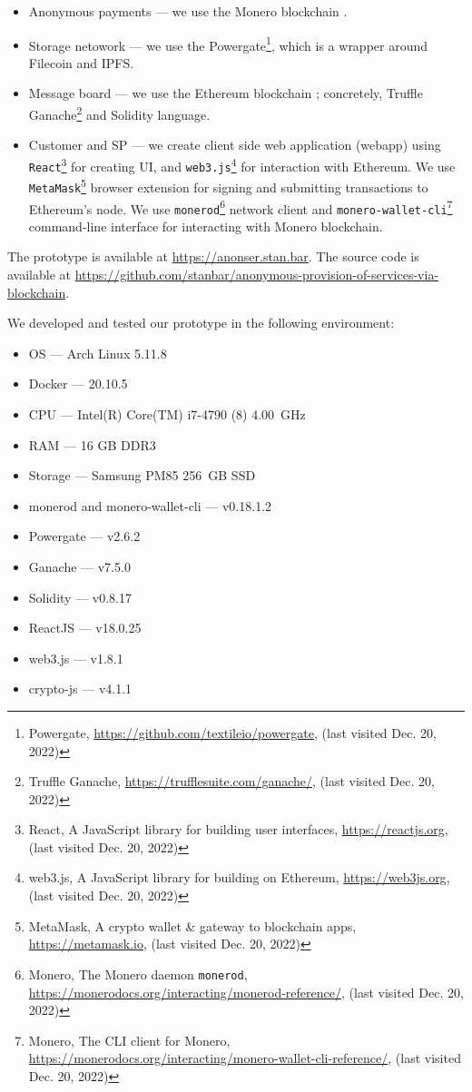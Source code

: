 \begin{itemize}
  \item{Anonymous payments} — we use the Monero blockchain \cite{noetherRingSignatureConfidential2015}.
  \item{Storage netowork} — we use the Powergate\footnote{Powergate, \url{https://github.com/textileio/powergate}, (last visited Dec. 20, 2022)}, which is a wrapper around Filecoin and IPFS.
  \item{Message board} — we use the Ethereum blockchain \cite{woodEthereumSecureDecentralised2014}; concretely, Truffle Ganache\footnote{Truffle Ganache, \url{https://trufflesuite.com/ganache/}, (last visited Dec. 20, 2022)} and Solidity language.
  \item{Customer and SP} — we create client side web application (webapp) using \texttt{React}\footnote{React, A JavaScript library for building user interfaces, \url{https://reactjs.org}, (last visited Dec. 20, 2022)} for creating UI, and \texttt{web3.js}\footnote{web3.js, A JavaScript library for building on Ethereum, \url{https://web3js.org}, (last visited Dec. 20, 2022)} for interaction with Ethereum. We use \texttt{MetaMask}\footnote{MetaMask, A crypto wallet \& gateway to blockchain apps, \url{https://metamask.io}, (last visited Dec. 20, 2022)} browser extension for signing and submitting transactions to Ethereum's node. We use \texttt{monerod}\footnote{Monero, The Monero daemon \texttt{monerod}, \url{https://monerodocs.org/interacting/monerod-reference/}, (last visited Dec. 20, 2022)} network client and \texttt{monero-wallet-cli}\footnote{Monero, The CLI client for Monero, \url{https://monerodocs.org/interacting/monero-wallet-cli-reference/}, (last visited Dec. 20, 2022)} command-line interface for interacting with Monero blockchain.
\end{itemize}

The prototype is available at \url{https://anonser.stan.bar}. The source code is available at \url{https://github.com/stanbar/anonymous-provision-of-services-via-blockchain}.

We developed and tested our prototype in the following environment:

\begin{itemize}
  \item{OS} — Arch Linux 5.11.8
  \item{Docker} — 20.10.5
  \item{CPU} — Intel(R) Core(TM) i7-4790 (8) 4.00~GHz
  \item{RAM} — 16 GB DDR3
  \item{Storage} — Samsung PM85 256~GB SSD

  \item{monerod and monero-wallet-cli} — v0.18.1.2
  \item{Powergate} — v2.6.2
  \item{Ganache} — v7.5.0
  \item{Solidity} — v0.8.17
  \item{ReactJS} — v18.0.25
  \item{web3.js} — v1.8.1
  \item{crypto-js} — v4.1.1
\end{itemize}

